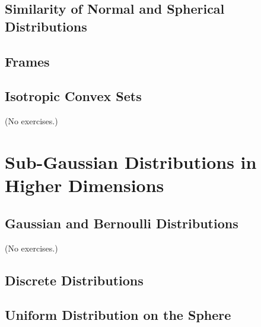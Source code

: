 \documentclass{report}
\theoremstyle{definition}
\newenvironment{exercise}[1]{
  \renewcommand\theexerciseimpl{#1}
  \exerciseimpl
}{\endexerciseimpl}
\begin{document}
\begin{exercise}{3.3.6}
\end{exercise}

\subsection{Similarity of Normal and Spherical Distributions}

\begin{exercise}{3.3.7}
\end{exercise}

\subsection{Frames}

\begin{exercise}{3.3.9}
\end{exercise}

\subsection{Isotropic Convex Sets}

(No exercises.)

\section{Sub-Gaussian Distributions in Higher Dimensions}

\begin{exercise}{3.4.3}
\end{exercise}

\subsection{Gaussian and Bernoulli Distributions}

(No exercises.)

\subsection{Discrete Distributions}

\begin{exercise}{3.4.4}
\end{exercise}

\begin{exercise}{3.4.5}
\end{exercise}

\subsection{Uniform Distribution on the Sphere}
\end{document}
